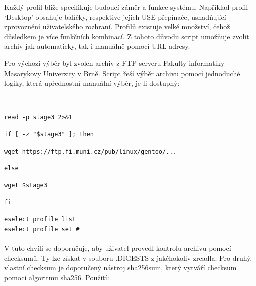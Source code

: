 \documentclass[12pt,a4paper,twoside,]{article}
\begin{document}
{{Každý profil blíže specifikuje budoucí záměr a funkce systému. Například profil
‘Desktop’ obsahuje balíčky, respektive jejich USE přepínače, usnadňující zprovoznění
uživatelského rozhraní.
Profilů existuje velké množství, čehož důsledkem je více funkčních kombinací. Z
tohoto důvodu script umožňuje zvolit archiv jak automaticky, tak i manuálně pomocí
URL adresy. 

Pro výchozí výběr byl zvolen archiv z FTP serveru Fakulty informatiky
Masarykovy Univerzity v Brně. Script řeší výběr archivu pomocí jednoduché logiky,
která upřednostní manuální výběr, je-li dostupný:}\\

{\hspace*{+1.5em}\texttt{read -p stage3 2>\&1}\\
{\hspace*{+1.5em}\texttt{if [ -z "\$stage3" ]; then}\\
{\hspace*{+1.5em}\texttt{\hspace*{+1.5em}wget https://ftp.fi.muni.cz/pub/linux/gentoo/...\\}
{\hspace*{+1.5em}\texttt{else}\\
{\hspace*{+1.5em}\texttt{\hspace*{+1.5em}wget \$stage3}\\
{\hspace*{+1.5em}\texttt{fi}\\

\hspace{-1.5em}{Nesprávně zvolený profil lze po dokončení instalace změnit pomocí:\\}

\texttt{eselect profile list}\\
\texttt{\hspace*{--1.5em}eselect profile set \#}\\

\hspace{-1.5em}{Uživatel by však měl mít na paměti, že změna profilu může, v některých případech
vést až k překompilování celého systému.}\\

\hspace{-1.5em}V tuto chvíli se doporučuje, aby uživatel provedl kontrolu archivu pomocí checksumů.
Ty lze získat v souboru .DIGESTS z jakéhokoliv zrcadla. Pro druhý, vlastní checksum je doporučený nástroj sha256sum, který vytváří checksum pomocí algoritmu sha256. Použití:

}}}}}}}
\end{document}
